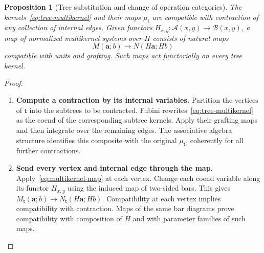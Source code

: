 \documentclass[oneside]{article}
\theoremstyle{plain}
\newtheorem{proposition}[theorem]{Proposition}
\theoremstyle{definition}
\theoremstyle{remark}
\begin{document}
\begin{proposition}[Tree substitution and change of operation categories]
\label{prop:tree-substitution}
The kernels~\eqref{eq:tree-multikernel} and their maps
$\mu_{\mathsf t}$ are compatible with contraction of any collection
of internal edges. Given functors
$H_{x,y}:\mathcal A(x,y)\to\mathcal B(x,y)$, a map of normalized
multikernel systems over $H$ consists of natural maps
\begin{equation}\label{eq:multikernel-map}
 M(\mathbf a;b)\longrightarrow N(H\mathbf a;Hb)
\end{equation}
compatible with units and grafting. Such maps act functorially on
every tree kernel.
\end{proposition}
\begin{proof}
\leavevmode
\begin{enumerate}
\item \textbf{Compute a contraction by its internal variables.}
Partition the vertices of $\mathsf t$ into the subtrees to be
contracted. Fubini rewrites~\eqref{eq:tree-multikernel} as the
coend of the corresponding subtree kernels. Apply their grafting
maps and then integrate over the remaining edges. The associative
algebra structure identifies this composite with the original
$\mu_{\mathsf t}$, coherently for all further contractions.
\item \textbf{Send every vertex and internal edge through the map.}
Apply~\eqref{eq:multikernel-map} at each vertex. Change each coend
variable along its functor $H_{x,y}$ using the induced map of
two-sided bars. This gives
$M_{\mathsf t}(\mathbf a;b)\to N_{\mathsf t}(H\mathbf a;Hb)$.
Compatibility at each vertex implies compatibility with contraction.
Maps of the same bar diagrams prove compatibility with composition
of $H$ and with parameter families of such maps.\qedhere
\end{enumerate}
\end{proof}
\end{document}
